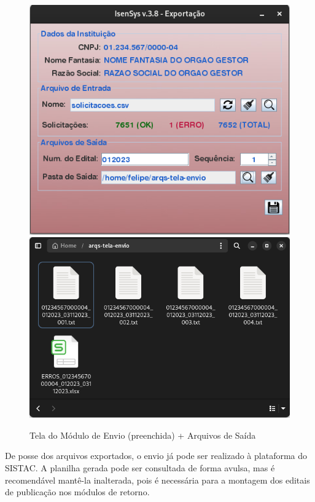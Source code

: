\documentclass[
	12pt,			%
	openright,		%
	oneside,	
	a4paper,		%
	english,		%
	brazil			%
]{abntex2/abntex2}  %
\begin{document}
				\begin{figure}[H]
					\begin{center}
						
						\caption{Tela do Módulo de Envio (preenchida) + Arquivos de Saída}
						\label{envio-ui-processed}
						
						\includegraphics[scale=0.4]{img/envio-ui-processed}
						\includegraphics[scale=0.3]{img/envio-files}
						
					\end{center}
				\end{figure}

				De posse dos arquivos exportados, o envio já pode ser realizado à plataforma do SISTAC. A planilha gerada pode ser consultada de forma avulsa, mas é recomendável mantê-la inalterada, pois é necessária para a montagem dos editais de publicação nos módulos de retorno.
\end{document}
